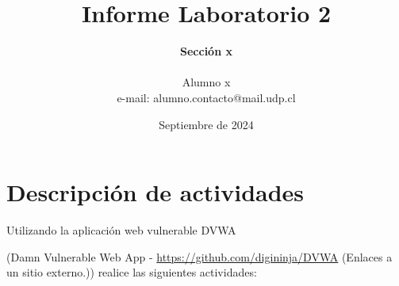 \documentclass[letter,12pt]{article}
\begin{document}
%
   \title{\Huge{Informe Laboratorio 2}}

   \author{\textbf{Sección x} \\  \\Alumno x \\ e-mail: alumno.contacto@mail.udp.cl}
          
   \date{Septiembre de 2024}

   \maketitle
   
   \tableofcontents
 
  \newpage
  

\section{Descripción de actividades}
Utilizando la aplicación web vulnerable DVWA

(Damn Vulnerable Web App - \href{https://github.com/digininja/DVWA}{https://github.com/digininja/DVWA} (Enlaces a un sitio externo.)) realice las siguientes actividades:
\end{document}

